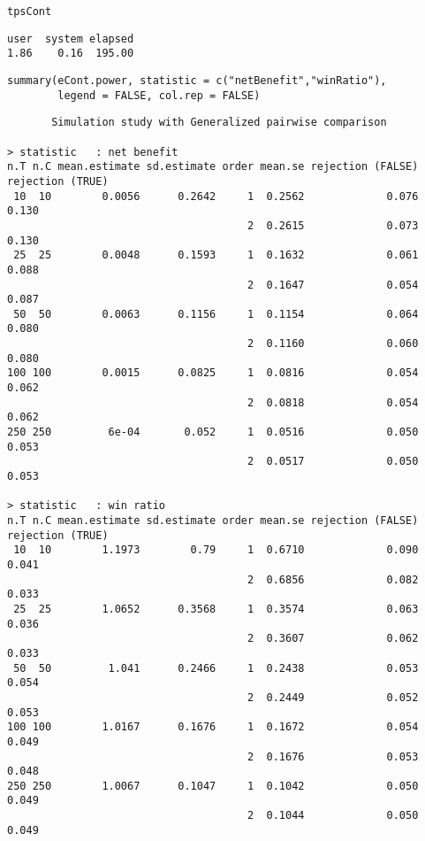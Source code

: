 \documentclass[12pt]{article}
\begin{document}
\lstset{language=r,label= ,caption= ,captionpos=b,numbers=none}
\begin{lstlisting}
tpsCont
\end{lstlisting}

\begin{verbatim}
user  system elapsed 
1.86    0.16  195.00
\end{verbatim}

\lstset{language=r,label= ,caption= ,captionpos=b,numbers=none}
\begin{lstlisting}
summary(eCont.power, statistic = c("netBenefit","winRatio"), 
		legend = FALSE, col.rep = FALSE)
\end{lstlisting}

\begin{verbatim}
       Simulation study with Generalized pairwise comparison

> statistic   : net benefit
n.T n.C mean.estimate sd.estimate order mean.se rejection (FALSE) rejection (TRUE)
 10  10        0.0056      0.2642     1  0.2562             0.076            0.130
                                      2  0.2615             0.073            0.130
 25  25        0.0048      0.1593     1  0.1632             0.061            0.088
                                      2  0.1647             0.054            0.087
 50  50        0.0063      0.1156     1  0.1154             0.064            0.080
                                      2  0.1160             0.060            0.080
100 100        0.0015      0.0825     1  0.0816             0.054            0.062
                                      2  0.0818             0.054            0.062
250 250         6e-04       0.052     1  0.0516             0.050            0.053
                                      2  0.0517             0.050            0.053

> statistic   : win ratio
n.T n.C mean.estimate sd.estimate order mean.se rejection (FALSE) rejection (TRUE)
 10  10        1.1973        0.79     1  0.6710             0.090            0.041
                                      2  0.6856             0.082            0.033
 25  25        1.0652      0.3568     1  0.3574             0.063            0.036
                                      2  0.3607             0.062            0.033
 50  50         1.041      0.2466     1  0.2438             0.053            0.054
                                      2  0.2449             0.052            0.053
100 100        1.0167      0.1676     1  0.1672             0.054            0.049
                                      2  0.1676             0.053            0.048
250 250        1.0067      0.1047     1  0.1042             0.050            0.049
                                      2  0.1044             0.050            0.049
\end{verbatim}
\end{document}
